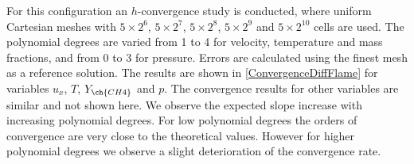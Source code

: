 {For this configuration an $h$-convergence study is conducted, where uniform Cartesian meshes with  $5\times2^6$, $5\times2^7$, $5\times2^8$,  $5\times2^9$ and $5\times2^{10}$  cells are used. The polynomial degrees are varied from 1 to 4 for velocity, temperature and mass fractions, and from 0 to 3 for pressure.  Errors are calculated using the finest mesh as a reference solution.  The results are shown in \cref{ConvergenceDiffFlame} for variables $u_x$, $T$, $Y_{\ch{CH4}}$ and $p$. The convergence results for other variables are similar and not shown here. We observe the expected slope increase with increasing polynomial degrees. For low polynomial degrees the orders of convergence are very close to the theoretical values. However for higher polynomial degrees we observe a slight deterioration of the convergence rate.  

}
